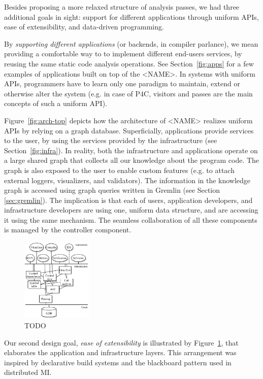 \documentclass[sigconf]{acmart}
\begin{document}
Besides proposing a more relaxed structure of analysis passes, we had three additional goals in sight: support for different applications through uniform APIs, ease of extensibility, and data-driven programming.

By \textit{supporting different applications} (or backends, in compiler parlance), we mean providing a comfortable way to to implement different end-users services, by reusing the same static code analysis operations.
See Section~\ref{fig:apps} for a few examples of applications built on top of the <NAME>.
In systems with uniform APIs, programmers have to learn only one paradigm to maintain, extend or otherwise alter the system (e.g. in case of P4C, visitors and passes are the main concepts of such a uniform API). 

Figure~\ref{fig:arch-top} depicts how the architecture of <NAME> realizes uniform APIs by relying on a graph database. 
Superficially, applications provide services to the user, by using the services provided by the infrastructure (see Section~\ref{fig:infra}). In reality, both the infrastructure and applications operate on a large shared graph that collects all our knowledge about the program code. The graph is also exposed to the user to enable custom features (e.g. to attach external loggers, visualizers, and validators). The information in the knowledge graph is accessed using graph queries written in Gremlin (see Section \ref{sec:gremlin}). The implication is that each of users, application developers, and infrastructure developers are using one, uniform data structure, and are accessing it using the same mechanism. The seamless collaboration of all these components is managed by the controller component.

  \begin{figure}
    \includegraphics[width=0.3\textwidth]{figures/arch-deps.pdf}
    \caption{TODO}\label{fig:arch-deps}
  \end{figure}

Our second design goal, \textit{ease of extensibility} is illustrated by Figure~\ref{fig:arch-deps}, that elaborates the application and infrastructure layers. 
This arrangement was inspired by declarative build systems and the blackboard pattern used in distributed MI.
\end{document}

